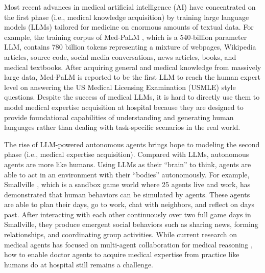 \documentclass[fleqn,12pt]{wlscirep}
\begin{document}
Most recent advances in medical artificial intelligence (AI) \cite{Moor:23:GMAI,Singhal:23:Med-PaLM,Li:23:Llava-med, Moor:23:Med-Flamingo,Tu:24:MedPaLM_Med,Ma:24:GHAI} have concentrated on the first phase (i.e., medical knowledge acquisition) by training large language models (LLMs) \cite{OpenAI:24:GPT4,Meta:23:Llama,Liu:23:Llava} tailored for medicine on enormous amounts of textual data. 
For example, the training corpus of Med-PaLM \cite{Singhal:23:Med-PaLM}, which is a 540-billion parameter LLM, contains 780 billion tokens representing a mixture of webpages, Wikipedia articles, source code, social media conversations, news articles, books, and medical textbooks. After acquiring general and medical knowledge from massively large data, Med-PaLM is reported to be the first LLM to reach the human expert level on answering the US Medical Licensing Examination (USMLE) style questions. 
Despite the success of medical LLMs, it is hard to directly use them to model medical expertise acquisition at hospital because they are designed to provide foundational capabilities of understanding and generating human languages rather than dealing with task-specific scenarios in the real world.

The rise of LLM-powered autonomous agents \cite{Park:23:Smallville,Yao:23:ReAct,Schick:23:Toolformer,Wei:22:CoT,Yao:23:ToT,Shinn:23:Reflexion,Zelikman:22:Star,Shen:23:Hugginggpt} brings hope to modeling the second phase (i.e., medical expertise acquisition). 
Compared with LLMs, autonomous agents are more like humans. Using LLMs as their ``brain'' to think, agents are able to act in an environment with their ``bodies'' autonomously\cite{Wang:23:Voyager,Gao:23:S3,Hua:23:WarAgent, Wang:23:RecAgent, Zhang:24:Generative_recagent,Williams:23:epidemic_generative_agent, Xiao:23:simulating_public, Xu:23:Werewolf,Zhao:23:Competeai,Li:TradingGPT,Hong:23:MetaGPT,Qian:23:ChatDev,Guo:24:multiagent_survey,Chen:23:Agentverse, Yang:24:UA3,Liu:24:DyLAN,Yang:24:ActRe}. 
For example, Smallville \cite{Park:23:Smallville}, which is a sandbox game world where 25 agents live and work, has demonstrated that human behaviors can be simulated by agents. These agents are able to plan their days, go to work, chat with neighbors, and reflect on days past. After interacting with each other continuously over two full game days in Smallville, they produce emergent social behaviors such as sharing news, forming relationships, and coordinating group activities. 
While current research on medical agents has focused on multi-agent collaboration for medical reasoning \cite{Tang:23:MedAgents,Fan:24:AI_Hospital,Li:24:Mmedagent,Kim:24:MDAgents,Wei:24:MedAide,Kim:24:colla_llms_medical,Lievin:24:medical_reasoning,Nori:23:Medprompt}, how to enable doctor agents to acquire medical expertise from practice like humans do at hospital still remains a challenge.
\end{document}
